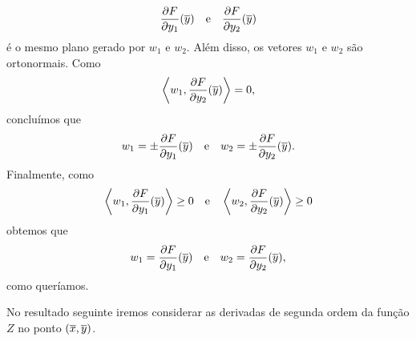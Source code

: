 \begin{demonstracao}
\begin{equation*}
\frac{\partial F}{\partial y_1}(\overline{y}) \quad \text{e} \quad 
\frac{\partial F}{\partial y_2}(\overline{y})
\end{equation*}
é o mesmo plano gerado por $w_1$ e $w_2$. Al\'em disso, os vetores
$w_1$ e $w_2$ s\~ao ortonormais. Como
\begin{equation*}
\left\langle w_1, \frac{\partial F}{\partial y_2}(\overline{y}) \right\rangle = 0,
\end{equation*}
conclu\'imos que
\begin{equation*}
w_1 = \pm \frac{\partial F}{\partial y_1}(\overline{y}) 
\quad \text{e} \quad 
w_2 = \pm \frac{\partial F}{\partial y_2}(\overline{y}).
\end{equation*}
Finalmente, como
\begin{equation*}
\left\langle w_1, \frac{\partial F}{\partial y_1}(\overline{y}) \right\rangle \geq 0 
\quad \text{e} \quad 
\left\langle w_2, \frac{\partial F}{\partial y_2}(\overline{y}) \right\rangle \geq 0
\end{equation*}	
obtemos que
\begin{equation*}
w_1 = \frac{\partial F}{\partial y_1}(\overline{y}) \quad \text{e} \quad 
w_2 = \frac{\partial F}{\partial y_2}(\overline{y}),
\end{equation*}
como quer\'iamos.
\end{demonstracao}

No resultado seguinte iremos considerar as derivadas de segunda
ordem da fun\c c\~ao $Z$ no ponto $(\overline{x},\overline{y})$.

